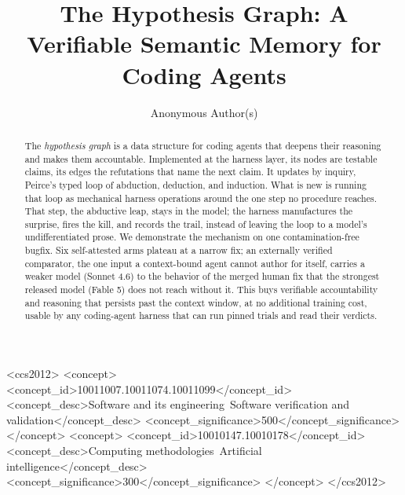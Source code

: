 \documentclass[sigconf,review,anonymous]{acmart}
\begin{document}
\title{The Hypothesis Graph: A Verifiable Semantic Memory for Coding Agents}

\author{Anonymous Author(s)}

\begin{abstract}
The \emph{hypothesis graph} is a data structure for coding agents that deepens their reasoning and makes them accountable. Implemented at the harness layer, its nodes are testable claims, its edges the refutations that name the next claim. It updates by inquiry, Peirce's typed loop of abduction, deduction, and induction. What is new is running that loop as mechanical harness operations around the one step no procedure reaches. That step, the abductive leap, stays in the model; the harness manufactures the surprise, fires the kill, and records the trail, instead of leaving the loop to a model's undifferentiated prose. We demonstrate the mechanism on one contamination-free bugfix. Six self-attested arms plateau at a narrow fix; an externally verified comparator, the one input a context-bound agent cannot author for itself, carries a weaker model (Sonnet 4.6) to the behavior of the merged human fix that the strongest released model (Fable 5) does not reach without it. This buys verifiable accountability and reasoning that persists past the context window, at no additional training cost, usable by any coding-agent harness that can run pinned trials and read their verdicts.
\end{abstract}

\begin{CCSXML}
<ccs2012>
<concept>
<concept_id>10011007.10011074.10011099</concept_id>
<concept_desc>Software and its engineering~Software verification and validation</concept_desc>
<concept_significance>500</concept_significance>
</concept>
<concept>
<concept_id>10010147.10010178</concept_id>
<concept_desc>Computing methodologies~Artificial intelligence</concept_desc>
<concept_significance>300</concept_significance>
</concept>
</ccs2012>
\end{CCSXML}


\maketitle
\end{document}
